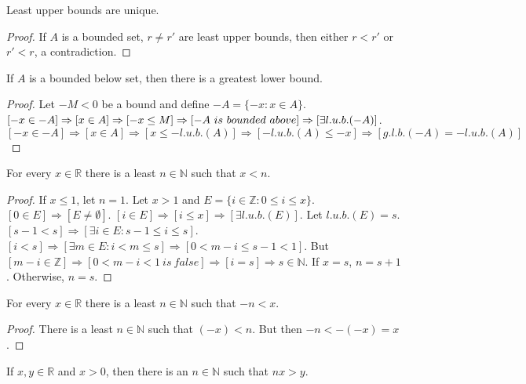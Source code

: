             \begin{theorem}
            Least upper bounds are unique.
            \end{theorem}
            \begin{proof}
            If $A$ is a bounded set, $r\ne r'$ are least upper bounds, then either $r<r'$ or $r'<r$, a contradiction.
            \end{proof}
            \begin{theorem}
            If $A$ is a bounded below set, then there is a greatest lower bound.
            \end{theorem}
            \begin{proof}
            Let $-M<0$ be a bound and define $-A = \{-x: x\in A\}$. $[-x\in -A]\Rightarrow [x\in A]\Rightarrow [-x\leq M]\Rightarrow [-A\ is\ bounded\ above]\\ \Rightarrow [\exists l.u.b.(-A)]$. $[-x\in -A]\Rightarrow [x\in A]\Rightarrow [x\leq -l.u.b.(A)]\Rightarrow [-l.u.b.(A)\leq -x]\Rightarrow [g.l.b.(-A)=-l.u.b.(A)]$
            \end{proof}
            \begin{theorem}
            For every $x\in \mathbb{R}$ there is a least $n\in \mathbb{N}$ such that $x<n$. 
            \end{theorem}
            \begin{proof}
            If $x\leq1$, let $n=1$. Let $x>1$ and $E=\{i \in \mathbb{Z}: 0 \leq i \leq x\}$. $[0\in E]\Rightarrow [E\ne \emptyset]$. $[i\in E]\Rightarrow [i\leq x]\Rightarrow [\exists l.u.b.(E)]$. Let $l.u.b.(E)=s$. $[s-1<s]\Rightarrow [\exists i \in E:s-1 \leq i \leq s]$. $[i< s]\Rightarrow[\exists m\in E: i < m \leq s]\Rightarrow [0 < m-i \leq s-1 < 1]$. But $[m-i \in \mathbb{Z}]\Rightarrow [0<m-i<1\ is\ false]\Rightarrow [i = s]\Rightarrow s\in \mathbb{N}$. If $x=s$, $n = s+1$. Otherwise, $n=s$.
            \end{proof}
            \begin{theorem}
            For every $x\in \mathbb{R}$ there is a least $n\in \mathbb{N}$ such that $-n<x$.
            \end{theorem}
            \begin{proof}
            There is a least $n\in \mathbb{N}$ such that $(-x)<n$. But then $-n <-(-x) = x$. 
            \end{proof}
            \begin{theorem}
            If $x,y\in \mathbb{R}$ and $x>0$, then there is an
            $n\in \mathbb{N}$ such that $nx>y$.
            \end{theorem}
